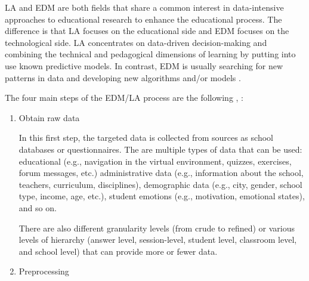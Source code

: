 LA and EDM are both fields that share a common interest in data-intensive approaches to educational research to enhance the educational process. The difference is that LA focuses on the educational side and EDM focuses on the technological side. LA concentrates on data-driven decision-making and combining the technical and pedagogical dimensions of learning by putting into use known predictive models. In contrast, EDM is usually searching for new patterns in data and developing new algorithms and/or models \cite{romero2020educational}.

The four main steps of the EDM/LA process are the following \cite{sokkhey2020developing}, \cite{romero2020educational}:

\begin{enumerate}
    \item Obtain raw data
    
    In this first step, the targeted data is collected from sources as school databases or questionnaires. The are multiple types of data that can be used: educational (e.g., navigation in the virtual environment, quizzes, exercises, forum messages, etc.) administrative data (e.g., information about the school, teachers, curriculum, disciplines), demographic data (e.g., city, gender, school type, income, age, etc.), student emotions (e.g., motivation, emotional states), and so on.
    
    There are also different granularity levels (from crude to refined) or various levels of hierarchy (answer level, session-level, student level, classroom level, and school level) that can provide more or fewer data.
    
    \item Preprocessing
    

\end{enumerate}
